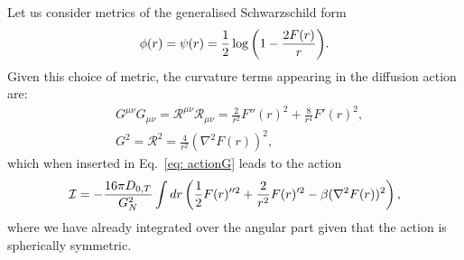 \documentclass[aps,pra,amsmath,amssymb,amsthm,floatfix,nofootinbib,notitlepage,superscriptaddress,10pt]{revtex4-2}
\begin{document}
Let us consider metrics of the generalised Schwarzschild form 
\begin{align}
	\phi(r)=\psi(r)=\frac{1}{2}\log{\left(1-\frac{2F(r)}{r}\right)}.
	\label{eq: ansatz-app}
\end{align}
Given this choice of metric, the curvature terms appearing in the diffusion action are:
\begin{align}
	&G^{\mu\nu}G_{\mu\nu}=\mathcal{R}^{\mu\nu}\mathcal{R}_{\mu\nu} = \frac{2}{r^2}F''(r)^2+\frac{8}{r^4}F'(r)^2,\\
	&G^2=\mathcal{R}^2 = \frac{4}{r^2}\left( \nabla^2F(r)\right)^2,
\end{align}
which when inserted in Eq.~\eqref{eq: actionG} leads to the action
\begin{align}
	\mathcal{I}=-\frac{16 \pi D_{0,T}}{G_N^2} \int dr  \left(\frac{1}{2}F(r)''^2+\frac{2}{r^2}F(r)'^2-\beta(\nabla^2F(r))^2 \right),
\end{align}
where we have already integrated over the angular part given that the action is spherically symmetric.
\end{document}
